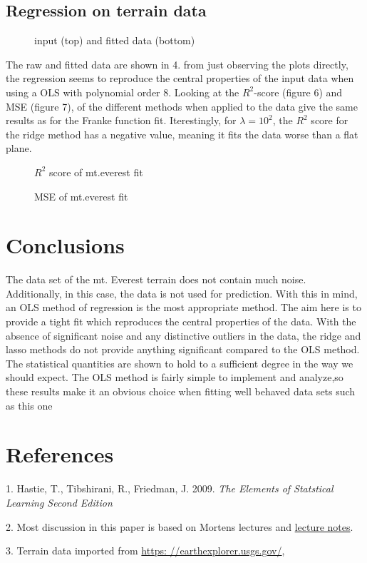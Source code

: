 \documentclass{emulateapj}
\begin{document}
\subsection{Regression on terrain data}
\begin{figure}[t]

\mbox{}
\mbox{}
\caption{ input (top) and fitted data (bottom)}
\label{fig:figure_label}
\end{figure}
The raw and fitted data are shown in 4. from just observing the plots directly, the regression seems to reproduce the central properties of the input data when using a OLS with polynomial order 8. Looking at the $R^2$-score (figure 6) and MSE (figure 7), of the different methods when applied to the data give the same results as for the Franke function fit. Iterestingly, for $\lambda = 10^2$, the $R^2$ score for the ridge method has a negative value, meaning it fits the data worse than a flat plane.  

\begin{figure}[t]

\mbox{}
\caption{ $R^2$ score of mt.everest fit}
\label{fig:figure_label}
\end{figure}
\begin{figure}[h]

\mbox{}
\caption{ MSE of mt.everest fit }
\label{fig:figure_label}
\end{figure}
\section{Conclusions}
The data set of the mt. Everest terrain does not contain much noise. Additionally, in this case, the data is not used for prediction. With this in mind,  an OLS method of regression is the most appropriate method. The aim here is to provide a tight fit which reproduces the central properties of the data. With the absence of significant noise and any distinctive outliers in the data, the ridge and lasso methods do not provide anything significant compared to the OLS method. The statistical quantities are shown to hold to a sufficient degree in the way we should expect. The OLS method is fairly simple to implement and analyze,so these results make it an obvious choice when fitting well behaved data sets such as this one

\section{References}
1. Hastie, T., Tibshirani, R., Friedman, J. 2009. \textit{The Elements of Statstical Learning Second Edition}

2. Most discussion in this paper is based on Mortens lectures and \href{https://compphysics.github.io/MachineLearning/doc/web/course.html}{lecture notes}.

3. Terrain data imported from  \href{https:
//earthexplorer.usgs.gov/}{https:
//earthexplorer.usgs.gov/},
\end{document}
